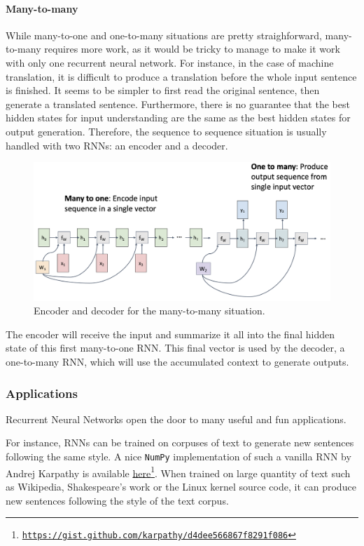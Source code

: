 \paragraph*{Many-to-many}
While many-to-one and one-to-many situations are pretty straighforward, many-to-many requires more work, as it would be tricky to manage to make it work with only one recurrent neural network. For instance, in the case of machine translation, it is difficult to produce a translation before the whole input sentence is finished. It seems to be simpler to first read the original sentence, then generate a translated sentence. Furthermore, there is no guarantee that the best hidden states for input understanding are the same as the best hidden states for output generation. Therefore, the sequence to sequence situation is usually handled with two RNNs: an encoder and a decoder.
\begin{figure}[H]
    \centering
    \includegraphics[width=.8\textwidth]{images/rnn-many-to-many.png}
    \caption{Encoder and decoder for the many-to-many situation.}
\end{figure}
The encoder will receive the input and summarize it all into the final hidden state of this first many-to-one RNN. This final vector is used by the decoder, a one-to-many RNN, which will use the accumulated context to generate outputs.

\subsubsection{Applications}
Recurrent Neural Networks open the door to many useful and fun applications. 

For instance, RNNs can be trained on corpuses of text to generate new sentences following the same style. A nice \texttt{NumPy} implementation of such a vanilla RNN by Andrej Karpathy is available \href{https://gist.github.com/karpathy/d4dee566867f8291f086}{here}\footnote{\href{https://gist.github.com/karpathy/d4dee566867f8291f086}{\nolinkurl{https://gist.github.com/karpathy/d4dee566867f8291f086}}}. When trained on large quantity of text such as Wikipedia, Shakespeare's work or the Linux kernel source code, it can produce new sentences following the style of the text corpus.

